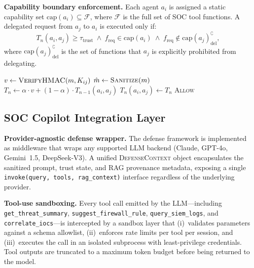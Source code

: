 \documentclass[journal,twoside]{IEEEtran}
\begin{document}
\textbf{Capability boundary enforcement.}
Each agent $a_i$ is assigned a static capability set
$\text{cap}(a_i) \subseteq \mathcal{F}$, where $\mathcal{F}$ is
the full set of SOC tool functions.  A delegated request from $a_j$
to $a_i$ is executed only if:
\begin{equation}
  T_n(a_i, a_j) \ge \tau_{\text{trust}} \;\wedge\;
  f_{\text{req}} \in \text{cap}(a_i) \;\wedge\;
  f_{\text{req}} \notin \text{cap}(a_j)^{\complement}_{\text{del}},
  \label{eq:capcheck}
\end{equation}
where $\text{cap}(a_j)^{\complement}_{\text{del}}$ is the set of
functions that $a_j$ is explicitly prohibited from delegating.

\begin{algorithm}[t]
\caption{Inter-Agent Trust Verification}\label{alg:trust}
\BlankLine
{}
$v \gets \textsc{VerifyHMAC}(m, K_{ij})$\;
$\hat{m} \gets \textsc{Sanitize}(m)$ 
$T_n \gets \alpha \cdot v + (1-\alpha) \cdot T_{n-1}(a_i, a_j)$\;
$T_n(a_i, a_j) \gets T_n$\;
\Return \textsc{Allow}\;
\end{algorithm}

\subsection{SOC Copilot Integration Layer}
\label{sec:defense:soc}

\textbf{Provider-agnostic defense wrapper.}
The defense framework is implemented as middleware that wraps any
supported LLM backend (Claude, GPT-4o, Gemini~1.5, DeepSeek-V3).
A unified \textsc{DefenseContext} object encapsulates the sanitized
prompt, trust state, and RAG provenance metadata, exposing a single
\texttt{invoke(query, tools, rag\_context)} interface regardless of
the underlying provider.

\textbf{Tool-use sandboxing.}
Every tool call emitted by the LLM---including
\texttt{get\_threat\_summary},
\texttt{suggest\_firewall\_rule},
\texttt{query\_siem\_logs}, and
\texttt{correlate\_iocs}---is
intercepted by a sandbox layer that (i)~validates parameters against
a schema allowlist, (ii)~enforces rate limits per tool per session,
and (iii)~executes the call in an isolated subprocess with
least-privilege credentials.  Tool outputs are truncated to a
maximum token budget before being returned to the model.
\end{document}
